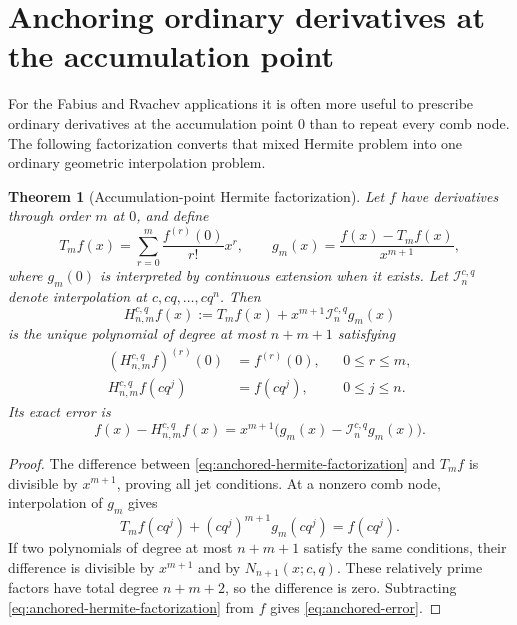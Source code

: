 \documentclass[11pt,oneside]{book}
\numberwithin{equation}{chapter}
\newtheorem{theorem}{Theorem}[chapter]
\theoremstyle{definition}
\theoremstyle{remark}
\newcommand{\Interp}{\mathcal I}
\begin{document}
\section{Anchoring ordinary derivatives at the accumulation point}
\label{sec:anchored-hermite}

For the Fabius and Rvachev applications it is often more useful to prescribe
ordinary derivatives at the accumulation point $0$ than to repeat every
comb node.  The following factorization converts that mixed Hermite problem
into one ordinary geometric interpolation problem.

\begin{theorem}[Accumulation-point Hermite factorization]
\label{thm:anchored-hermite}
Let $f$ have derivatives through order $m$ at $0$, and define
\begin{equation}
 T_mf(x)=\sum_{r=0}^{m}\frac{f^{(r)}(0)}{r!}x^r,
 \qquad
 g_m(x)=\frac{f(x)-T_mf(x)}{x^{m+1}},
 \label{eq:anchored-g-definition}
\end{equation}
where $g_m(0)$ is interpreted by continuous extension when it exists.  Let
$\Interp_n^{c,q}$ denote interpolation at $c,cq,\ldots,cq^n$.  Then
\begin{equation}
 \boxed{
 H_{n,m}^{c,q}f(x)
 :=T_mf(x)+x^{m+1}\Interp_n^{c,q}g_m(x)}
 \label{eq:anchored-hermite-factorization}
\end{equation}
is the unique polynomial of degree at most $n+m+1$ satisfying
\begin{align}
 (H_{n,m}^{c,q}f)^{(r)}(0)&=f^{(r)}(0),
 &&0\le r\le m,
 \label{eq:anchored-jet-conditions}\\
 H_{n,m}^{c,q}f(cq^j)&=f(cq^j),
 &&0\le j\le n.
 \label{eq:anchored-value-conditions}
\end{align}
Its exact error is
\begin{equation}
 f(x)-H_{n,m}^{c,q}f(x)
 =x^{m+1}\bigl(g_m(x)-\Interp_n^{c,q}g_m(x)\bigr).
 \label{eq:anchored-error}
\end{equation}
\end{theorem}

\begin{proof}
The difference between \eqref{eq:anchored-hermite-factorization} and
$T_mf$ is divisible by $x^{m+1}$, proving all jet conditions.  At a nonzero
comb node, interpolation of $g_m$ gives
\[
 T_mf(cq^j)+(cq^j)^{m+1}g_m(cq^j)=f(cq^j).
\]
If two polynomials of degree at most $n+m+1$ satisfy the same conditions,
their difference is divisible by $x^{m+1}$ and by
$N_{n+1}(x;c,q)$.  These relatively prime factors have total degree
$n+m+2$, so the difference is zero.  Subtracting
\eqref{eq:anchored-hermite-factorization} from $f$ gives
\eqref{eq:anchored-error}.
\end{proof}
\end{document}
